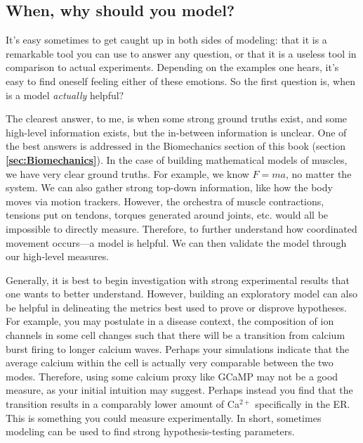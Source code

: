 \subsection{When, why should you model?}

It's easy sometimes to get caught up in both sides of modeling: that it is a remarkable tool you can use to answer any question, or that it is a useless tool in comparison to actual experiments. Depending on the examples one hears, it's easy to find oneself feeling either of these emotions. So the first question is, when is a model \textit{actually} helpful?\newline

The clearest answer, to me, is when some strong ground truths exist, and some high-level information exists, but the in-between information is unclear. One of the best answers is addressed in the Biomechanics section of this book (section \textbf{\ref{sec:Biomechanics}}). In the case of building mathematical models of muscles, we have very clear ground truths. For example, we know $F = ma$, no matter the system. We can also gather strong top-down information, like how the body moves via motion trackers. However, the orchestra of muscle contractions, tensions put on tendons, torques generated around joints, etc. would all be impossible to directly measure. Therefore, to further understand how coordinated movement occurs---a model is helpful. We can then validate the model through our high-level measures.\newline

Generally, it is best to begin investigation with strong experimental results that one wants to better understand. However, building an exploratory model can also be helpful in delineating the metrics best used to prove or disprove hypotheses. For example, you may postulate in a disease context, the composition of ion channels in some cell changes such that there will be a transition from calcium burst firing to longer calcium waves. Perhaps your simulations indicate that the average calcium within the cell is actually very comparable between the two modes. Therefore, using some calcium proxy like GCaMP may not be a good measure, as your initial intuition may suggest. Perhaps instead you find that the transition results in a comparably lower amount of Ca$^{2+}$ specifically in the ER. This is something you could measure experimentally. In short, sometimes modeling can be used to find strong hypothesis-testing parameters. 




